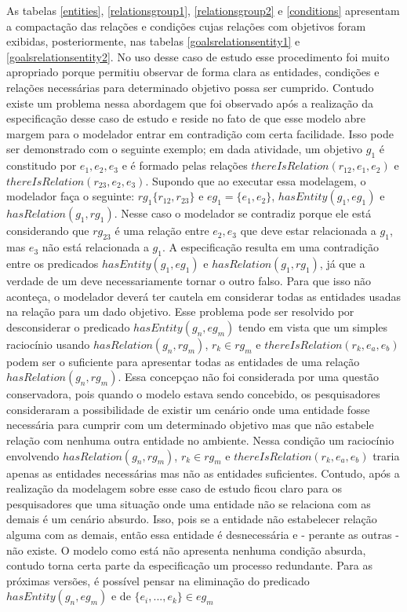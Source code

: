As tabelas \ref{entities}, \ref{relationsgroup1}, \ref{relationsgroup2} e \ref{conditions} apresentam a compactação das relações e condições cujas relações com objetivos foram exibidas, 
posteriormente, nas tabelas \ref{goalsrelationsentity1} e \ref{goalsrelationsentity2}. No uso desse caso de estudo esse procedimento foi muito apropriado porque permitiu observar de forma 
clara as entidades, condições e relações necessárias para determinado objetivo possa ser cumprido. Contudo existe um problema nessa abordagem que foi observado após a realização da
especificação desse caso de estudo e reside no fato de que esse modelo abre margem para o modelador entrar em contradição com certa facilidade. Isso pode ser demonstrado com o  
seguinte exemplo; em dada atividade, um objetivo $g_1$ é constitudo por $e_1,e_2,e_3$ e é formado pelas relações $thereIsRelation(r_{12},e_1,e_2)$ e $thereIsRelation(r_{23},e_2,e_3)$. 
Supondo que ao executar essa modelagem, o modelador faça o seguinte: $rg_1 \{ r_{12},r_{23} \}$ e $ eg_1 = \{ e_1, e_2 \} $, $ hasEntity(g_1,eg_1) $ e $ hasRelation(g_1, rg_1) $. Nesse 
caso o modelador se contradiz porque ele está considerando que $rg_{23}$ é uma relação entre $e_2, e_3$ que deve estar relacionada a $g_1$, mas $e_3$ não está relacionada a $g_1$. A especificação 
resulta em uma contradição entre os predicados $ hasEntity(g_1,eg_1) $ e $ hasRelation(g_1, rg_1) $, já que a verdade de um deve necessariamente tornar 
o outro falso. Para que isso não aconteça, o modelador deverá ter cautela em considerar todas as entidades usadas na relação para um dado objetivo. Esse problema pode ser resolvido por 
desconsiderar o predicado $hasEntity(g_n,eg_m)$ tendo em vista que um simples raciocínio usando $hasRelation(g_n,rg_m)$, $r_k \in rg_m$ e $thereIsRelation(r_k, e_a,e_b)$ podem ser o suficiente 
para apresentar todas as entidades de uma relação $ hasRelation(g_n, rg_m) $. Essa concepçao não foi considerada por uma questão conservadora, pois quando o modelo estava sendo concebido, 
os pesquisadores consideraram a possibilidade de existir um cenário onde uma entidade fosse necessária para cumprir com um determinado objetivo mas que não estabele relação com nenhuma 
outra entidade no ambiente. Nessa condição um raciocínio envolvendo $hasRelation(g_n,rg_m)$, $r_k \in rg_m$ e $thereIsRelation(r_k, e_a,e_b)$ traria apenas as entidades necessárias 
mas não as entidades suficientes. Contudo, após a realização da modelagem sobre esse caso de estudo ficou claro para os pesquisadores que uma situação onde uma entidade não se relaciona 
com as demais é um cenário absurdo. Isso, pois se a entidade não estabelecer relação alguma com as demais, então essa entidade é desnecessária e - perante as outras - não existe. O modelo 
como está não apresenta nenhuma condição absurda, contudo torna certa parte da especificação um processo redundante. Para as próximas versões, é possível pensar na eliminação do predicado 
$ hasEntity(g_n,eg_m) $ e de $ \{ e_i , ... , e_k \} \in eg_m $

